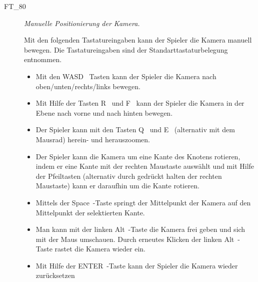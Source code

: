 \begin{description}
		\item[FT\_80] \textit{Manuelle Positionierung der Kamera.} \hfill\\
	
	\label{FT:80}
	
	Mit den folgenden Tastatureingaben kann der Spieler die Kamera manuell bewegen. Die Tastatureingaben sind der Standarttastaturbelegung entnommen.
	
			\begin{itemize} 
        \item Mit den \glqq WASD\grqq~ Tasten kann der Spieler die Kamera nach oben/unten/rechts/links bewegen.
        \item Mit Hilfe der Tasten \glqq R\grqq~ und \glqq F\grqq~ kann der Spieler die Kamera in der Ebene nach vorne und nach hinten bewegen.
        \item Der Spieler kann mit den Tasten \glqq Q \grqq~und \glqq E\grqq~ (alternativ mit dem Mausrad) herein- und herauszoomen.
        \item Der Spieler kann die Kamera um eine Kante des Knotens rotieren, indem er eine Kante mit der rechten Maustaste auswählt und mit Hilfe der Pfeiltasten (alternativ durch gedrückt halten der rechten Maustaste) kann er daraufhin um die Kante rotieren.
        \item Mittels der \glqq Space\grqq~-Taste springt der Mittelpunkt der Kamera auf den Mittelpunkt der selektierten Kante.
        \item Man kann mit der linken \glqq Alt\grqq~-Taste die Kamera frei geben und sich mit der Maus umschauen. Durch erneutes Klicken der linken \glqq Alt\grqq~-Taste rastet die Kamera wieder ein.
        \item Mit Hilfe der \glqq ENTER\grqq~-Taste kann der Spieler die Kamera wieder zurücksetzen
		
		\end{itemize}
	
\end{description}









